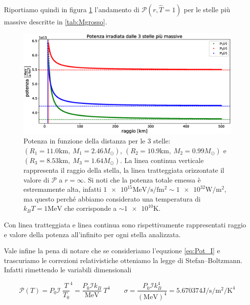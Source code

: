 \documentclass[a4paper, titlepage]{article}
\begin{document}
Riportiamo quindi in figura \ref{fig:Pot} l'andamento di
$\mathcal P (r, \hat T = 1)$ per le stelle più massive descritte in
\ref{tab:Mgrosso}.

\begin{figure}[h]
    \centering
    \includegraphics[width = \textwidth]{Figures/Pot.eps}
    \caption{Potenza in funzione della distanza per le 3 stelle:
    $(R_1 = 11.0 \unit{\kilo\meter},~M_1 = 2.46 M_\odot)$,
    $(R_2 = 10.9 \unit{\kilo\meter},~M_2 = 0.99 M_\odot)$ e
    $(R_3 = 8.53 \unit{\kilo\meter},~M_3 = 1.64 M_\odot)$.
    La linea continua verticale rappresenta il raggio della stella, la linea
    tratteggiata orizzontate il valore di $\mathcal{P}$ a $r = \infty$.
    Si noti che la potenza totale emessa è estremamente alta, infatti
    $\num{1e15} \unit{\mega\electronvolt\per\second\per\femto\meter\squared}
    \sim \num{1e32} \unit{\watt\per\meter\squared}$, ma questo perché abbiamo
    considerato una temperatura di $k_B T = 1 \unit{\mega\electronvolt}$ che
    corrisponde a $\sim \num{1e10} \unit{\kelvin}$.}
    \label{fig:Pot}
\end{figure}

Con linea tratteggiata e linea continua sono rispettivamente rappresentati
raggio e valore della potenza all'infinito per ogni stella analizzata.

Vale infine la pena di notare che se consideriamo l'equzione \ref{eq:Pot_I} e
trascuriamo le correzioni relativistiche otteniamo la legge di Stefan–Boltzmann.
Infatti rimettendo le variabili dimensionali

\begin{equation}
    \mathcal P (T) = P_0 \mathcal I ~ \frac{T}{T_0}^4
    = \frac{P_0 \mathcal I k_B}{\unit{\mega\electronvolt}} ~ T^4
    \quad \quad
    \sigma = \frac{P_0 \mathcal I k_B^4}{(\unit{\mega\electronvolt})^4}
    = 5.670374 \unit{\joule\per\second\per\meter\squared\per\kelvin\tothe4}
\end{equation}
\end{document}
